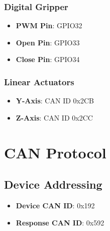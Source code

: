 \documentclass{article}
\begin{document}
\subsubsection{Digital Gripper}
\begin{itemize}
    \item \textbf{PWM Pin}: GPIO32
    \item \textbf{Open Pin}: GPIO33
    \item \textbf{Close Pin}: GPIO34
\end{itemize}

\subsubsection{Linear Actuators}
\begin{itemize}
    \item \textbf{Y-Axis}: CAN ID 0x2CB
    \item \textbf{Z-Axis}: CAN ID 0x2CC
\end{itemize}

\section{CAN Protocol}

\subsection{Device Addressing}
\begin{itemize}
    \item \textbf{Device CAN ID}: 0x192
    \item \textbf{Response CAN ID}: 0x592
\end{itemize}
\end{document}

